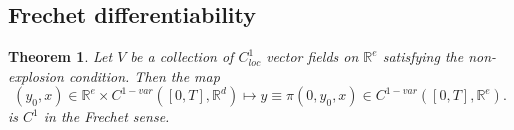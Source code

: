 \documentclass{article}
\newcommand{\R}{\mathbb{R}}
\newtheorem{theorem}{Theorem}
\begin{document}
\subsection{Frechet differentiability}

\begin{theorem}
    Let $V$ be a collection of $C^1_{loc}$ vector fields on $\R^e$ satisfying the non-explosion condition. Then the map
    \begin{equation}
        (y_0, x) \in \R^e \times C^{1-var}([0,T], \R^d) \mapsto y \equiv \pi(0, y_0, x) \in C^{1-var}([0,T], \R^e).
    \end{equation}
    is $C^1$ in the Frechet sense.
\end{theorem}
\end{document}
